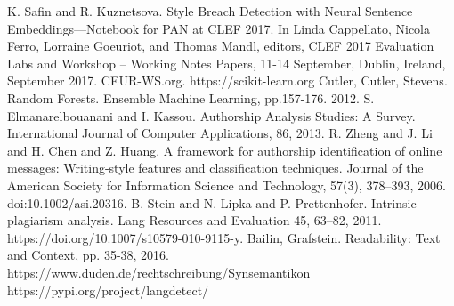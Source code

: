 \documentclass[conference]{IEEEtran}
\begin{document}
\begin{thebibliography}{00}
 K. Safin and R. Kuznetsova. Style Breach Detection with Neural Sentence Embeddings—Notebook for PAN at CLEF 2017. In Linda Cappellato, Nicola Ferro, Lorraine Goeuriot, and Thomas Mandl, editors, CLEF 2017 Evaluation Labs and Workshop – Working Notes Papers, 11-14 September, Dublin, Ireland, September 2017. CEUR-WS.org.
 https://scikit-learn.org
 Cutler, Cutler, Stevens. Random Forests. Ensemble Machine Learning, pp.157-176. 2012.
 S. Elmanarelbouanani and I. Kassou. Authorship Analysis Studies: A Survey. International Journal of Computer Applications, 86, 2013.
 R. Zheng and J. Li and H. Chen and Z. Huang. A framework for authorship identification of online messages: Writing-style features and classification techniques. Journal of the American Society for Information Science and Technology, 57(3), 378–393, 2006. doi:10.1002/asi.20316.
 B. Stein and N. Lipka and P. Prettenhofer. Intrinsic plagiarism analysis. Lang Resources and Evaluation 45, 63–82, 2011. https://doi.org/10.1007/s10579-010-9115-y.
 Bailin, Grafstein. Readability: Text and Context, pp. 35-38, 2016.
 https://www.duden.de/rechtschreibung/Synsemantikon
 https://pypi.org/project/langdetect/
\end{thebibliography}
\end{document}

